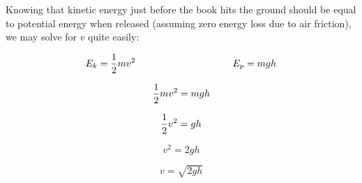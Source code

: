 \vskip 10pt

Knowing that kinetic energy just before the book hits the ground should be equal to potential energy when released (assuming zero energy loss due to air friction), we may solve for $v$ quite easily:

$$E_k = {1 \over 2}mv^2 \hbox{\hskip 100pt} E_p = mgh$$

$${1 \over 2}mv^2 = mgh$$

$${1 \over 2}v^2 = gh$$

$$v^2 = 2gh$$

$$v = \sqrt{2gh}$$











